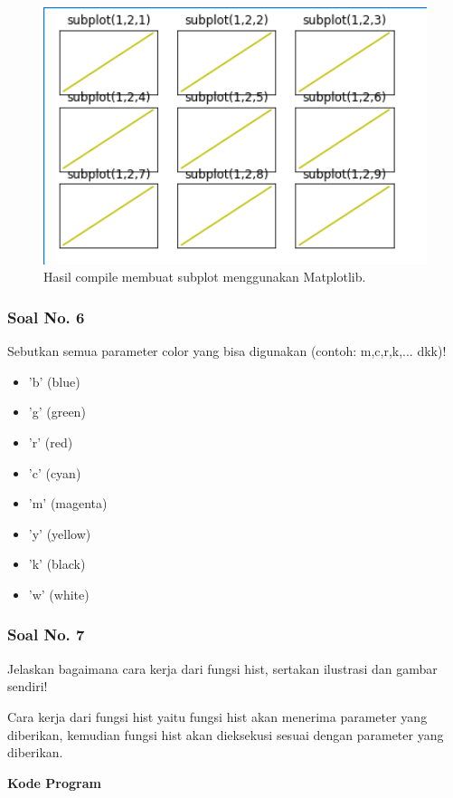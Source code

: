 \begin{figure}[H]
	\includegraphics[width=12cm]{figures/6/1174089/Praktek/subplot.png}
	\centering
	\caption{Hasil compile membuat subplot menggunakan Matplotlib.}
\end{figure}

\subsubsection{Soal No. 6}
\hfill \break
Sebutkan semua parameter color yang bisa digunakan (contoh:  m,c,r,k,...  dkk)!

\begin{itemize}
	\item 'b' (blue)
	\item 'g' (green)
	\item 'r' (red)
	\item 'c' (cyan)
	\item 'm' (magenta)
	\item 'y' (yellow)
	\item 'k' (black)
	\item 'w' (white)
\end{itemize}

\subsubsection{Soal No. 7}
\hfill \break
Jelaskan bagaimana cara kerja dari fungsi hist, sertakan ilustrasi dan gambar sendiri!

\hfill \break
Cara kerja dari fungsi hist yaitu fungsi hist akan menerima parameter yang diberikan, kemudian fungsi hist akan dieksekusi sesuai dengan parameter yang diberikan.

\hfill \break
\textbf{Kode Program}

